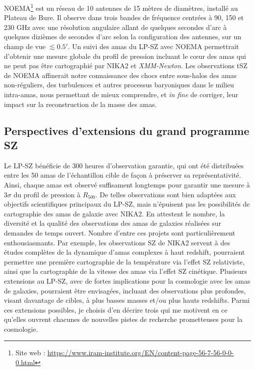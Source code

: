 NOEMA\footnote{Site web :
  \url{https://www.iram-institute.org/EN/content-page-56-7-56-0-0-0.html}}
est un réseau de 10 antennes de 15 mètres de diamètres, installé
au Plateau de Bure. Il observe dans trois bandes
de fréquence centrées à 90, 150 et 230 GHz avec une résolution
angulaire allant de quelques secondes d'arc à quelques dizièmes de
secondes d'arc selon la configuration des antennes, sur un champ de
vue $\lesssim 0.5'$. Un suivi des amas du LP-SZ avec NOEMA permettrait
d'obtenir une mesure globale du profil de pression incluant le c\oe ur
des amas qui ne peut pas être cartographié par NIKA2 et
\emph{XMM-Newton}. Les observations tSZ de NOEMA affinerait notre
connaissance des chocs entre sous-halos des amas non-réguliers, des
turbulences et autres processus baryoniques dans le milieu intra-amas,
nous permettant de mieux comprendre, et \emph{in fine} de corriger,
leur impact sur la reconstruction de la masse des amas.



\subsection{Perspectives d'extensions du grand programme SZ}

Le LP-SZ bénéficie de 300 heures d'observation garantie, qui ont été
distribuées entre les 50 amas de l'échantillon cible de façon à
préserver sa représentativité. Ainsi, chaque amas est observé
suffisament longtemps pour garantir une mesure à 3$\sigma$ du profil de
pression à $R_{500}$. De telles observations sont bien adaptées aux
objectifs scientifiques principaux du LP-SZ, mais n'épuisent pas les
possibilités de cartographie des amas de galaxie avec NIKA2. En
attestent le nombre, la diversité et la qualité des observations des
amas de galaxies réalisées sur demandes de temps ouvert. Nombre
d'entre ces projets sont particulièrement enthousiasmants. Par
exemple, les observations SZ de NIKA2 servent à des études complètes
de la dynamique d'amas complexes à haut redshift, pourraient permettre
une première cartographie de la température via l'effet SZ
relativiste, ainsi que la cartographie de la vitesse des amas via
l'effet SZ cinétique. Plusieurs extensions au LP-SZ, avec de fortes
implications pour la cosmologie avec les amas de galaxies, pourraient
être envisagées, incluant des observations plus profondes, visant
davantage de cibles, à plus basses masses et/ou plus hauts redshifts. 
Parmi ces extensions possibles, je choisis d'en décrire trois qui me
motivent en ce qu'elles ouvrent chacunes de nouvelles pistes de
recherche prometteuses pour la cosmologie.


